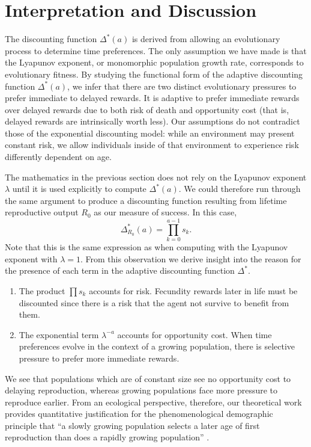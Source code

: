\documentclass[titlepage, hidelinks, 12pt]{article}
\theoremstyle{plain}
\theoremstyle{remark}
\theoremstyle{definition}
\begin{document}
\section{Interpretation and Discussion}

The discounting function $\Delta^*(a)$ is derived from allowing an evolutionary process to determine time preferences. The only assumption
we have made is that the Lyapunov exponent, or monomorphic population growth rate, corresponds to evolutionary fitness. By studying
the functional form of the adaptive discounting function $\Delta^*(a)$, we infer that there are two distinct evolutionary pressures to prefer
immediate to delayed rewards. It is adaptive to prefer immediate rewards over delayed rewards due to both
risk of death and opportunity cost (that is, delayed rewards are intrinsically worth less). Our assumptions do not contradict those
of the exponential discounting model: while an environment may present constant risk, we allow individuals inside of that environment to experience
risk differently dependent on age. 

The mathematics in the previous section does not rely on the Lyapunov exponent $\lambda$ until it is used
explicitly to compute $\Delta^*(a)$. We could therefore
run through the same argument to produce a discounting function resulting from lifetime reproductive output $R_0$ as our measure of success. In this
case, 
\begin{equation}
    \Delta_{R_0}^*(a) = \prod\limits_{k = 0}^{a-1} s_k.
\end{equation}
Note that this is the same expression as when computing with the Lyapunov exponent with $\lambda = 1$. From this observation we derive insight into
the reason for the presence of each term in the adaptive discounting function $\Delta^*$. 
\begin{enumerate}
    \item The product $\prod s_k$ accounts for risk. Fecundity rewards later in life must be discounted since there is a risk that the
        agent not survive to benefit from them.
    \item The exponential term $\lambda^{-a}$ accounts for opportunity cost. When time preferences evolve in the context of a growing
        population, there is selective pressure to prefer more immediate rewards. 
\end{enumerate}

We see that populations which are of constant size see no opportunity cost to delaying
reproduction, whereas growing populations face more pressure to reproduce earlier. 
From an ecological perspective, therefore, our theoretical work provides quantitative justification for the phenomenological demographic principle that
``a slowly growing population selects a later age of first reproduction than does a rapidly growing population''  
\cite{bull04}.  
\end{document}
